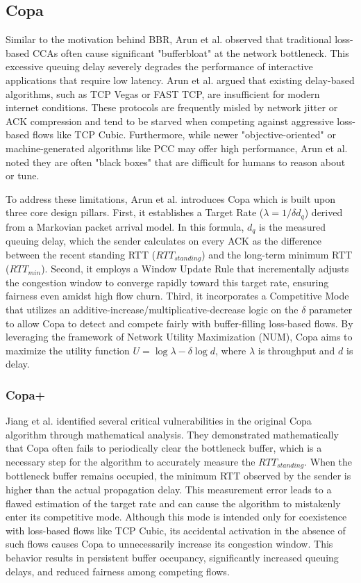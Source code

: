 \subsection{Copa}

Similar to the motivation behind BBR, Arun et al. observed that traditional loss-based \acs{CCA}s often cause significant "bufferbloat" at the network bottleneck\cite{COPA}. 
This excessive queuing delay severely degrades the performance of interactive applications that require low latency. 
Arun et al. argued that existing delay-based algorithms, such as TCP Vegas or FAST TCP, are insufficient for modern internet conditions.
These protocols are frequently misled by network jitter or ACK compression and tend to be starved when competing against aggressive loss-based flows like TCP Cubic. 
Furthermore, while newer "objective-oriented" or machine-generated algorithms like PCC may offer high performance, Arun et al. noted they are often "black boxes" that are difficult for humans to reason about or tune.

To address these limitations, Arun et al. introduces Copa which is built upon three core design pillars. 
First, it establishes a Target Rate ($\lambda = 1/\delta d_q$) derived from a Markovian packet arrival model. 
In this formula, $d_q$ is the measured queuing delay, which the sender calculates on every ACK as the difference between the recent standing RTT ($RTT_{standing}$) and the long-term minimum RTT ($RTT_{min}$). 
Second, it employs a Window Update Rule that incrementally adjusts the congestion window to converge rapidly toward this target rate, ensuring fairness even amidst high flow churn. 
Third, it incorporates a Competitive Mode that utilizes an additive-increase/multiplicative-decrease logic on the $\delta$ parameter to allow Copa to detect and compete fairly with buffer-filling loss-based flows. 
By leveraging the framework of Network Utility Maximization (NUM), Copa aims to maximize the utility function $U = \log \lambda - \delta \log d$, where $\lambda$ is throughput and $d$ is delay.

\subsubsection{Copa+}

Jiang et al. \cite{COPAPLUS} identified several critical vulnerabilities in the original Copa algorithm through mathematical analysis. 
They demonstrated mathematically that Copa often fails to periodically clear the bottleneck buffer, which is a necessary step for the algorithm to accurately measure the $RTT_{standing}$. 
When the bottleneck buffer remains occupied, the minimum RTT observed by the sender is higher than the actual propagation delay. 
This measurement error leads to a flawed estimation of the target rate and can cause the algorithm to mistakenly enter its competitive mode. 
Although this mode is intended only for coexistence with loss-based flows like TCP Cubic, its accidental activation in the absence of such flows causes Copa to unnecessarily increase its congestion window. 
This behavior results in persistent buffer occupancy, significantly increased queuing delays, and reduced fairness among competing flows.

